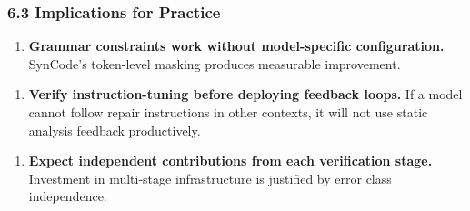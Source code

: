 \subsubsection{6.3 Implications for Practice}

\begin{enumerate}
\item \textbf{Grammar constraints work without model-specific configuration.} SynCode's token-level masking produces measurable improvement.
\end{enumerate}

\begin{enumerate}
\item \textbf{Verify instruction-tuning before deploying feedback loops.} If a model cannot follow repair instructions in other contexts, it will not use static analysis feedback productively.
\end{enumerate}

\begin{enumerate}
\item \textbf{Expect independent contributions from each verification stage.} Investment in multi-stage infrastructure is justified by error class independence.
\end{enumerate}
